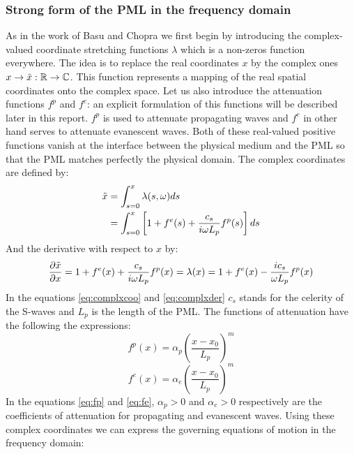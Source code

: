\subsubsection{Strong form of the PML in the frequency domain}
As in the work of Basu and Chopra \cite{Basu2003} we first begin by introducing the complex-valued coordinate stretching functions $\lambda$ which is a non-zeros function everywhere. The idea is to replace the real coordinates $x$ by the complex ones $x \rightarrow \Tilde{x} : \mathbb{R} \rightarrow \mathbb{C}$. This function represents a mapping of the real spatial coordinates onto the complex space. Let us also introduce the attenuation functions $f^p$ and $f^e$: an explicit formulation of this functions will be described later in this report. $f^p$ is used to attenuate propagating waves and $f^e$ in other hand serves to attenuate evanescent waves. Both of these real-valued positive functions vanish at the interface between the physical medium and the PML so that the PML matches perfectly the physical domain. The complex coordinates are defined by:
\begin{equation}
    \begin{aligned}
        \Tilde{x} &= \int^x_{s=0} \lambda(s,\omega) ds\\
        &= \int^x_{s=0} \left[ 1+f^e(s) +\frac{c_s}{i\omega L_p} f^p(s)  \right] ds
    \end{aligned}
    \label{eq:complxcoo}
\end{equation}
And the derivative with respect to $x$ by:
\begin{equation}
    \frac{\partial \Tilde{x}}{\partial x} = 1+f^e(x)+\frac{c_s}{i\omega L_p} f^p(x)= \lambda(x)= 1+f^e(x)-\frac{i c_s}{\omega L_p} f^p(x)
    \label{eq:complxder}
\end{equation}
In the equations \ref{eq:complxcoo} and \ref{eq:complxder} $c_s$ stands for the celerity of the S-waves and $L_p$ is the length of the PML. The functions of attenuation have the following the expressions:
\begin{equation}
    f^p(x) = \alpha_p \left(\frac{x-x_0}{L_p}\right)^m
    \label{eq:fp}
\end{equation}
\begin{equation}
    f^e(x) = \alpha_e \left(\frac{x-x_0}{L_p}\right)^m
    \label{eq:fe}
\end{equation}
In the equations \ref{eq:fp} and \ref{eq:fe}, $\alpha_p > 0$ and $\alpha_e > 0$ respectively are the coefficients of attenuation for propagating and evanescent waves.
Using these complex coordinates we can express the governing equations of motion in the frequency domain:
